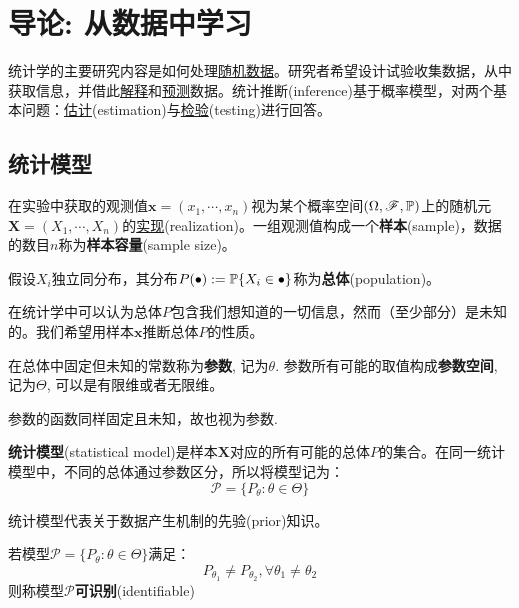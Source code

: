 \chapter{导论: 从数据中学习}\label{ch:intro}

统计学的主要研究内容是如何处理\underline{随机数据}。研究者希望设计试验收集数据，从中获取信息，并借此\underline{解释}和\underline{预测}数据。统计推断(inference)基于概率模型，对两个基本问题：\underline{估计}(estimation)与\underline{检验}(testing)进行回答。

\section{统计模型}\label{sec:inference}

\begin{definition}[样本]
      在实验中获取的观测值$\mathbf{x}=(x_1, \cdots ,x_n)$视为某个概率空间$(\Omega,\mathscr{F},\P)$上的随机元$\mathbf{X}=(X_1,\cdots ,X_n)$的\underline{实现}(realization)。一组观测值构成一个\textbf{样本}(sample)，数据的数目$n$称为\textbf{样本容量}(sample size)。
\end{definition}

\begin{definition}[总体]
      假设$X_i$独立同分布，其分布$P(\bullet):=\P\{X_i \in \bullet\}$称为\textbf{总体}(population)。
\end{definition}

在统计学中可以认为总体$P$包含我们想知道的一切信息，然而（至少部分）是未知的。我们希望用样本$\mathbf{x}$推断总体$P$的性质。

\begin{definition}[参数]
      在总体中固定但未知的常数称为\textbf{参数}, 记为$\theta$. 参数所有可能的取值构成\textbf{参数空间}, 记为$\Theta$, 可以是有限维或者无限维。
\end{definition}
\begin{remark}
      参数的函数同样固定且未知，故也视为参数. 
\end{remark}

\begin{definition}[统计模型]
      \textbf{统计模型}(statistical model)是样本$\mathbf{X}$对应的所有可能的总体$P$的集合。在同一统计模型中，不同的总体通过参数区分，所以将模型记为：
      \[ \mathcal{P}=\{ P_{\theta}:\theta \in \Theta \} \]
\end{definition}

统计模型代表关于数据产生机制的先验(prior)知识。

\begin{definition}[可识别]
      若模型$\mathcal{P}=\{ P_{\theta}:\theta \in \Theta \}$满足：
      \[ P_{\theta_1} \neq P_{\theta_2}, \forall \theta_1 \neq \theta_2 \]
      则称模型$\mathcal{P}$\textbf{可识别}(identifiable)
\end{definition}

